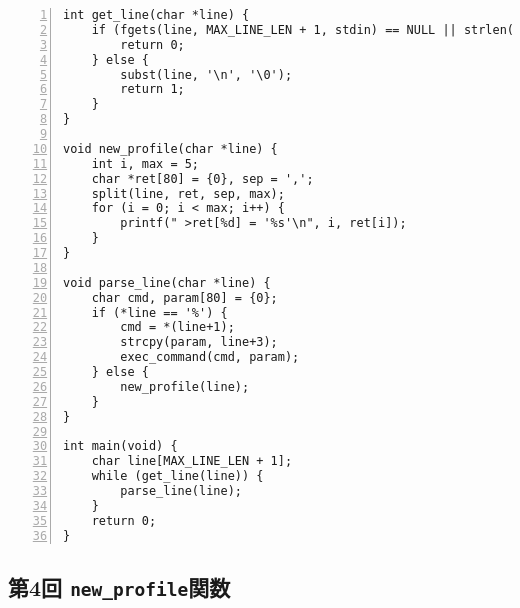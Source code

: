 \documentclass[autodetect-engine,dvi=dvipdfmx,ja=standard,
               a4j,11pt]{bxjsarticle}
\begin{document}
\begin{Verbatim}[numbers=left, xleftmargin=10mm, numbersep=6pt,
    fontsize=\small, baselinestretch=0.8]
int get_line(char *line) {
    if (fgets(line, MAX_LINE_LEN + 1, stdin) == NULL || strlen(line) > MAX_LINE_LEN || *line == '\n') {
        return 0;
    } else {
        subst(line, '\n', '\0');
        return 1;
    }
}

void new_profile(char *line) {
    int i, max = 5;
    char *ret[80] = {0}, sep = ',';
    split(line, ret, sep, max);
    for (i = 0; i < max; i++) {
        printf(" >ret[%d] = '%s'\n", i, ret[i]);
    }
}

void parse_line(char *line) {
    char cmd, param[80] = {0};
    if (*line == '%') {
        cmd = *(line+1);
        strcpy(param, line+3);
        exec_command(cmd, param);
    } else {
        new_profile(line);
    }
}

int main(void) {
    char line[MAX_LINE_LEN + 1];
    while (get_line(line)) {
        parse_line(line);
    }
    return 0;
}
\end{Verbatim}

\subsection{第4回 \texttt{new\_profile}関数} \label{code:4}
\end{document}
